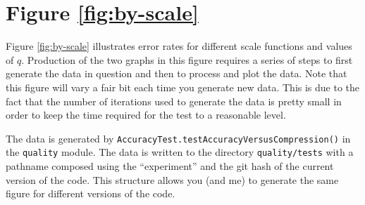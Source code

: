 \documentclass[]{statsoc}
\begin{document}
\section*{Figure \ref{fig:by-scale}}
Figure \ref{fig:by-scale} illustrates error rates for different scale functions and values of $q$. Production of the two graphs in this figure requires a series of steps to first generate the data in question and then to process and plot the data. Note that this figure will vary a fair bit each time you generate new data. This is due to the fact that the number of iterations used to generate the data is pretty small in order to keep the time required for the test to a reasonable level.

The data is generated by {\tt AccuracyTest.testAccuracyVersusCompression()} in the {\tt quality} module. The data is written to the directory {\tt quality/tests} with a pathname composed using the ``experiment'' and the git hash of the current version of the code. This structure allows you (and me) to generate the same figure for different versions of the code.
\end{document}
